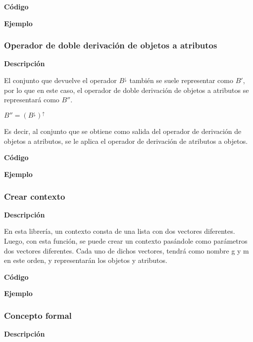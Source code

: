         \textbf{C\'odigo}

        

        \textbf{Ejemplo}


    \subsubsection{Operador de doble derivaci\'on de objetos a atributos}

        \textbf{Descripci\'on}

        El conjunto que devuelve el operador \( B^\downarrow \) tambi\'en se suele representar como \( B' \), por lo que en este caso, 
        el operador de doble derivaci\'on de objetos a atributos se representar\'a como \( B'' \).


        \( B'' = (B^\downarrow)^\uparrow \)

        Es decir, al conjunto que se obtiene como salida del operador de derivaci\'on de objetos a atributos, se le aplica el operador 
        de derivaci\'on de atributos a objetos.


        \textbf{C\'odigo}

        


        \textbf{Ejemplo}



    \subsubsection{Crear contexto}

        \textbf{Descripci\'on}

        En esta librer\'ia, un contexto consta de una lista con dos vectores diferentes. Luego, con esta funci\'on, se puede crear un contexto 
        pas\'andole como par\'ametros dos vectores diferentes.
        Cada uno de dichos vectores, tendr\'a como nombre g y m en este orden, y representar\'an los objetos y atributos.


        \textbf{C\'odigo}

        

        \textbf{Ejemplo}



    \subsubsection{Concepto formal}

    
        \textbf{Descripci\'on}

